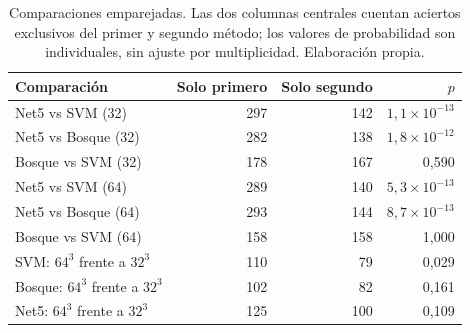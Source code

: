\begin{table}[htbp]\centering\small
\caption{Comparaciones emparejadas. Las dos columnas centrales cuentan aciertos exclusivos del primer y segundo método; los valores de probabilidad son individuales, sin ajuste por multiplicidad. Elaboración propia.}\label{tab:contrastes-finales}
\setlength{\tabcolsep}{4pt}
\begin{tabular}{@{}lrrr@{}}\toprule
Comparación & Solo primero & Solo segundo & $p$ \\\midrule
Net5 vs SVM (32) & 297 & 142 & $1,1\times10^{-13}$ \\
Net5 vs Bosque (32) & 282 & 138 & $1,8\times10^{-12}$ \\
Bosque vs SVM (32) & 178 & 167 & 0,590 \\
Net5 vs SVM (64) & 289 & 140 & $5,3\times10^{-13}$ \\
Net5 vs Bosque (64) & 293 & 144 & $8,7\times10^{-13}$ \\
Bosque vs SVM (64) & 158 & 158 & 1,000 \\
SVM: $64^3$ frente a $32^3$ & 110 & 79 & 0,029 \\
Bosque: $64^3$ frente a $32^3$ & 102 & 82 & 0,161 \\
Net5: $64^3$ frente a $32^3$ & 125 & 100 & 0,109 \\
\bottomrule\end{tabular}\end{table}
